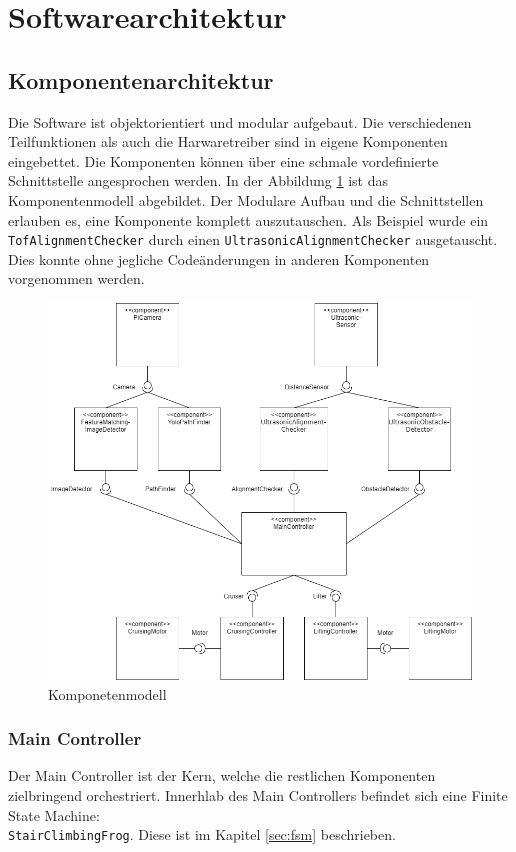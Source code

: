 \newpage

\section{Softwarearchitektur}

\subsection{Komponentenarchitektur}
Die Software ist objektorientiert und modular aufgebaut. Die verschiedenen Teilfunktionen als auch die Harwaretreiber sind in eigene Komponenten eingebettet. Die Komponenten können über eine schmale vordefinierte Schnittstelle angesprochen werden. In der Abbildung \ref{fig:komponentenmodell} ist das Komponentenmodell abgebildet. Der Modulare Aufbau und die Schnittstellen erlauben es, eine Komponente komplett auszutauschen. Als Beispiel wurde ein \texttt{TofAlignmentChecker} durch einen \texttt{UltrasonicAlignmentChecker} ausgetauscht. Dies konnte ohne jegliche Codeänderungen in anderen Komponenten vorgenommen werden.

\begin{figure}[H]
  \includegraphics[width=1\textwidth]{img/softwarearchitektur/Softwarearchitektur.png}
  \centering
  \caption{Komponetenmodell}
  \label{fig:komponentenmodell}
\end{figure}

\newpage

\subsubsection{Main Controller}
Der Main Controller ist der Kern, welche die restlichen Komponenten zielbringend orchestriert. Innerhlab des Main Controllers befindet sich eine Finite State Machine:\\ \texttt{StairClimbingFrog}. Diese ist im Kapitel \ref{sec:fsm} beschrieben. 

